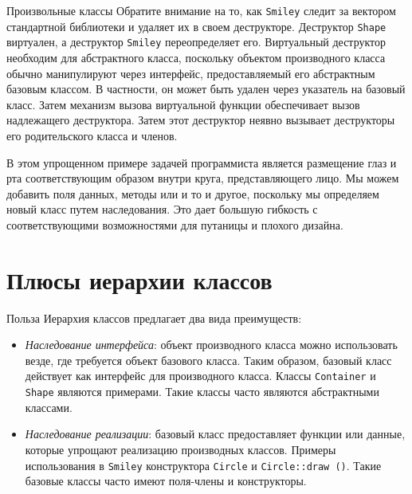 \documentclass[
    8pt,
    hyperref={pdfencoding=unicode}
    ]{beamer}
\theoremstyle{definition}
\begin{document}
\begin{frame}{Произвольные классы}
    Обратите внимание на то, как \texttt{Smiley} следит за вектором стандартной библиотеки и удаляет их в своем деструкторе.
    Деструктор \texttt{Shape} виртуален, а деструктор \texttt{Smiley} переопределяет его. 
    Виртуальный деструктор необходим для абстрактного класса, поскольку объектом производного
    класса обычно манипулируют через интерфейс, предоставляемый его абстрактным базовым классом. 
    В частности, он может быть удален через указатель на базовый класс.
    Затем механизм вызова виртуальной функции обеспечивает вызов надлежащего деструктора. 
    Затем этот деструктор неявно вызывает деструкторы его родительского класса и членов.
    
    \vspace{1em}
    В этом упрощенном примере задачей программиста является размещение глаз и рта соответствующим образом внутри круга,
    представляющего лицо.
    Мы можем добавить поля данных, методы или и то и другое, поскольку мы определяем новый класс путем наследования.
    Это дает большую гибкость с соответствующими возможностями для путаницы и плохого дизайна.
    
\end{frame}

\section{Плюсы иерархии классов}

\begin{frame}[fragile]{Польза}
    Иерархия классов предлагает два вида преимуществ:
    \begin{itemize}
        \item \emph{Наследование интерфейса}: объект производного класса можно использовать везде, где требуется объект базового класса. 
        Таким образом, базовый класс действует как интерфейс для производного класса. Классы  \texttt{Container} и  
        \texttt{Shape} являются примерами. Такие классы часто являются абстрактными классами.
        
        \item \emph{Наследование реализации}: базовый класс предоставляет функции или данные, которые упрощают реализацию производных 
        классов. Примеры использования в \texttt{Smiley} конструктора \texttt{Circle} и 
        \texttt{Circle::draw ()}. Такие базовые  классы часто имеют поля-члены и конструкторы.
    \end{itemize}
\end{frame}
\end{document}
